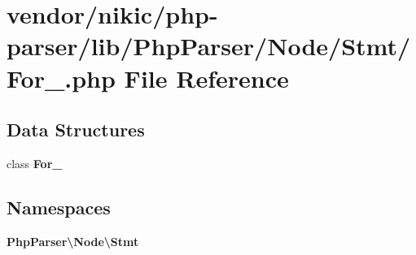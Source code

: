 \section{vendor/nikic/php-\/parser/lib/\+Php\+Parser/\+Node/\+Stmt/\+For\+\_\+.php File Reference}
\label{_for___8php}
\subsection*{Data Structures}
\begin{DoxyCompactItemize}
\item 
class {\bf For\+\_\+}
\end{DoxyCompactItemize}
\subsection*{Namespaces}
\begin{DoxyCompactItemize}
\item 
 {\bf Php\+Parser\textbackslash{}\+Node\textbackslash{}\+Stmt}
\end{DoxyCompactItemize}
